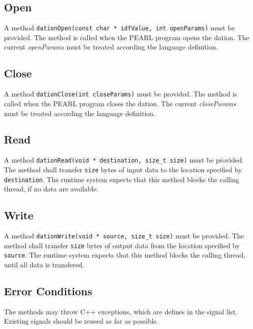 \subsection{Open}
A method \verb|dationOpen(const char * idfValue, int openParams)|
must be provided.
The method is called when the PEARL program opens the dation.
The current {\em openParams} must be treated according the language definition.

\subsection{Close}
A method \verb|dationClose(int closeParams)|
must be provided.
The method is called when the PEARL program closes the dation.
The current {\em closeParams} must be treated according the language 
definition.

\subsection{Read}
A method \verb|dationRead(void * destination, size_t size)|
must be provided. The method shall transfer \verb|size| bytes of
input data to the location specified by \verb|destination|.
The runtime system expects that this method blocks the calling thread,
if no data are available.

\subsection{Write}
A method \verb|dationWrite(void * source, size_t size)|
must be provided. The method shall transfer \verb|size| bytes of
output data from the location specified by \verb|source|.
The runtime system expects that this method blocks the calling thread,
until all data is transfered.

\subsection{Error Conditions}
The methods may throw C++ exceptions, which are defines in the signal list.
Existing signals should be reused as far as possible.

